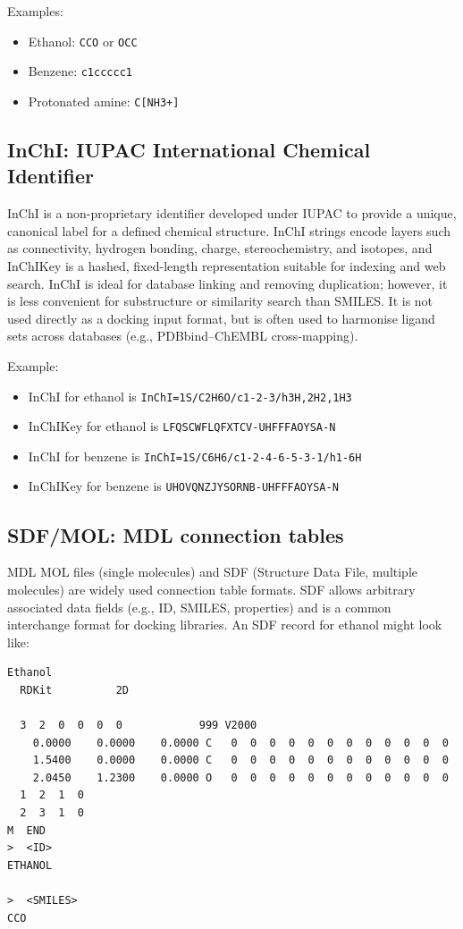 \documentclass[12pt]{article}
\begin{document}
Examples:
\begin{itemize}
  \item Ethanol: \verb|CCO| or \verb|OCC|
  \item Benzene: \verb|c1ccccc1|
  \item Protonated amine: \verb|C[NH3+]|
\end{itemize} 

\subsection{InChI: IUPAC International Chemical Identifier}

InChI\cite{CH6_Heller2013,CH6_McNaught2006,CH6_heller2009iupac} is a non-proprietary identifier developed under IUPAC to provide a unique, canonical label for a defined chemical structure. InChI strings encode layers such as connectivity, hydrogen bonding, charge, stereochemistry, and isotopes, and InChIKey is a hashed, fixed-length representation suitable for indexing and web search. InChI is ideal for database linking and removing duplication; however, it is less convenient for substructure or similarity search than SMILES. It is not used directly as a docking input format, but is often used to harmonise ligand sets across databases (e.g., PDBbind–ChEMBL cross-mapping).

Example:
\begin{itemize}
\item InChI for ethanol is \verb|InChI=1S/C2H6O/c1-2-3/h3H,2H2,1H3|
\item InChIKey for ethanol is \verb|LFQSCWFLQFXTCV-UHFFFAOYSA-N |
\item InChI for benzene is  \verb|InChI=1S/C6H6/c1-2-4-6-5-3-1/h1-6H|
\item InChIKey for benzene is \verb|UHOVQNZJYSORNB-UHFFFAOYSA-N|
\end{itemize}

\subsection{SDF/MOL: MDL connection tables}

MDL MOL files (single molecules) and SDF (Structure Data File, multiple molecules) are widely used connection table formats. SDF allows arbitrary associated data fields (e.g., ID, SMILES, properties) and is a common interchange format for docking libraries. An SDF record for ethanol might look like:

\begin{verbatim}
Ethanol
  RDKit          2D

  3  2  0  0  0  0            999 V2000
    0.0000    0.0000    0.0000 C   0  0  0  0  0  0  0  0  0  0  0  0
    1.5400    0.0000    0.0000 C   0  0  0  0  0  0  0  0  0  0  0  0
    2.0450    1.2300    0.0000 O   0  0  0  0  0  0  0  0  0  0  0  0
  1  2  1  0
  2  3  1  0
M  END
>  <ID>
ETHANOL

>  <SMILES>
CCO

\end{verbatim}
\end{document}
